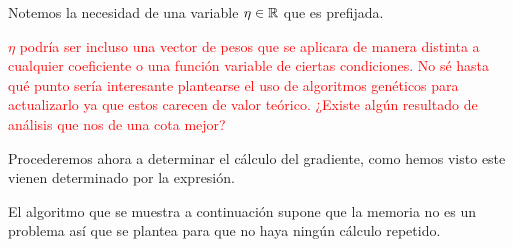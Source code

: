 Notemos la necesidad de una variable $\eta \in \mathbb{R}$ que es prefijada. 

\textcolor{red}{$\eta$ podría ser incluso una vector de pesos que se aplicara de manera distinta a cualquier coeficiente o una función variable de ciertas condiciones. No sé hasta qué punto sería interesante plantearse el uso de algoritmos genéticos para actualizarlo ya que estos carecen de valor teórico. ¿Existe algún resultado de análisis que nos de una cota mejor?}


Procederemos ahora a determinar el cálculo del gradiente, como hemos visto este vienen determinado por la expresión. 

El algoritmo que se muestra a continuación supone que la memoria no es un problema así que se plantea para que no haya ningún cálculo repetido. 


